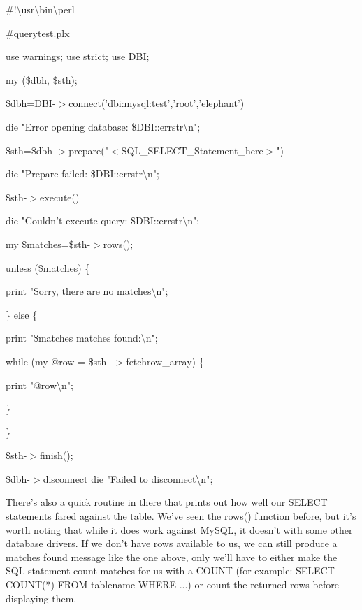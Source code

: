 \documentclass[a4paper,11pt]{book}
\begin{document}
\noindent 

\noindent \#!\textbackslash usr\textbackslash bin\textbackslash perl

\noindent \#querytest.plx

\noindent 

\noindent use warnings; use strict; use DBI;

\noindent 

\noindent my (\$dbh, \$sth);

\noindent 

\noindent \$dbh=DBI-$>$connect('dbi:mysql:test','root','elephant') \textbar \textbar 

\noindent die "Error opening database: \$DBI::errstr\textbackslash n";

\noindent 

\noindent \$sth=\$dbh-$>$prepare("$<$SQL\_SELECT\_Statement\_here$>$") \textbar \textbar 

\noindent die "Prepare failed: \$DBI::errstr\textbackslash n";

\noindent 

\noindent \$sth-$>$execute() \textbar \textbar 

\noindent die "Couldn't execute query: \$DBI::errstr\textbackslash n";

\noindent 

\noindent my \$matches=\$sth-$>$rows();

\noindent unless (\$matches) \{

\noindent print "Sorry, there are no matches\textbackslash n";

\noindent \} else \{

\noindent print "\$matches matches found:\textbackslash n";

\noindent while (my @row = \$sth -$>$fetchrow\_array) \{

\noindent print "@row\textbackslash n";

\noindent \}

\noindent \}

\noindent 

\noindent \$sth-$>$finish();

\noindent 

\noindent \$dbh-$>$disconnect \textbar \textbar  die "Failed to disconnect\textbackslash n";

\noindent 

\noindent There's also a quick routine in there that prints out how well our SELECT statements fared against the table. We've seen the rows() function before, but it's worth noting that while it does work against MySQL, it doesn't with some other database drivers. If we don't have rows available to us, we can still produce a matches found message like the one above, only we'll have to either make the SQL statement count matches for us with a COUNT (for example: SELECT COUNT(*) FROM tablename WHERE ...) or count the returned rows before displaying them.
\end{document}
